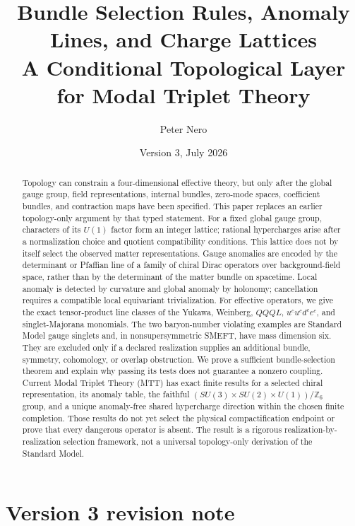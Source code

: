 \documentclass[11pt]{article}
\title{\textbf{Bundle Selection Rules, Anomaly Lines, and Charge Lattices}\\
\large A Conditional Topological Layer for Modal Triplet Theory}
\author{Peter Nero}
\date{Version 3, July 2026}
\newcommand{\Z}{\mathbb{Z}}
\begin{document}
\maketitle

\begin{abstract}
Topology can constrain a four-dimensional effective theory, but only after
the global gauge group, field representations, internal bundles, zero-mode
spaces, coefficient bundles, and contraction maps have been specified. This
paper replaces an earlier topology-only argument by that typed statement.
For a fixed global gauge group, characters of its \(U(1)\) factor form an
integer lattice; rational hypercharges arise after a normalization choice and
quotient compatibility conditions. This lattice does not by itself select
the observed matter representations. Gauge anomalies are encoded by the
determinant or Pfaffian line of a family of chiral Dirac operators over
background-field space, rather than by the determinant of the matter bundle
on spacetime. Local anomaly is detected by curvature and global anomaly by
holonomy; cancellation requires a compatible local equivariant
trivialization. For effective operators, we give the exact tensor-product
line classes of the Yukawa, Weinberg, \(QQQL\),
\(u^cu^cd^ce^c\), and singlet-Majorana monomials. The two baryon-number
violating examples are Standard Model gauge singlets and, in nonsupersymmetric
SMEFT, have mass dimension six. They are excluded only if a declared
realization supplies an additional bundle, symmetry, cohomology, or overlap
obstruction. We prove a sufficient bundle-selection theorem and explain why
passing its tests does not guarantee a nonzero coupling. Current Modal
Triplet Theory (MTT) has exact finite results for a selected chiral
representation, its anomaly table, the faithful
\((SU(3)\times SU(2)\times U(1))/\Z_6\) group, and a unique anomaly-free
shared hypercharge direction within the chosen finite completion. Those
results do not yet select the physical compactification endpoint or prove
that every dangerous operator is absent. The result is a rigorous
realization-by-realization selection framework, not a universal topology-only
derivation of the Standard Model.
\end{abstract}

\section*{Version 3 revision note}
\end{document}
